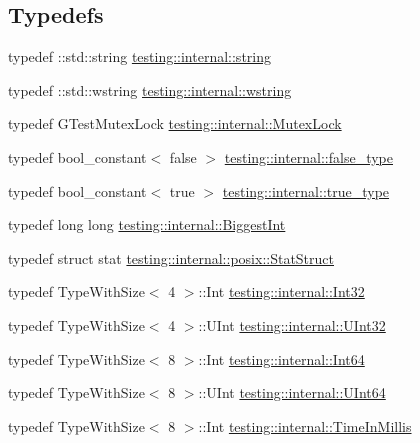 \subsection*{Typedefs}
\begin{DoxyCompactItemize}
\item 
typedef \+::std\+::string \hyperlink{namespacetesting_1_1internal_a8e8ff5b11e64078831112677156cb111}{testing\+::internal\+::string}
\item 
typedef \+::std\+::wstring \hyperlink{namespacetesting_1_1internal_a3f543179329c353aee1d7b54a9a8e335}{testing\+::internal\+::wstring}
\item 
typedef G\+Test\+Mutex\+Lock \hyperlink{namespacetesting_1_1internal_a08b187c6cc4e28400aadf9a32fccc8de}{testing\+::internal\+::\+Mutex\+Lock}
\item 
typedef bool\+\_\+constant$<$ false $>$ \hyperlink{namespacetesting_1_1internal_abb1d0789f19bdde21affccbd1078b525}{testing\+::internal\+::false\+\_\+type}
\item 
typedef bool\+\_\+constant$<$ true $>$ \hyperlink{namespacetesting_1_1internal_a62f917c3424d8841de9b49b5ec28edb4}{testing\+::internal\+::true\+\_\+type}
\item 
typedef long long \hyperlink{namespacetesting_1_1internal_a05c6bd9ede5ccdf25191a590d610dcc6}{testing\+::internal\+::\+Biggest\+Int}
\item 
typedef struct stat \hyperlink{namespacetesting_1_1internal_1_1posix_a8eb9f08d3af29941c2d2a964cfff3ecb}{testing\+::internal\+::posix\+::\+Stat\+Struct}
\item 
typedef Type\+With\+Size$<$ 4 $>$\+::Int \hyperlink{namespacetesting_1_1internal_a8ee38faaf875f133358abaf9bc056cec}{testing\+::internal\+::\+Int32}
\item 
typedef Type\+With\+Size$<$ 4 $>$\+::U\+Int \hyperlink{namespacetesting_1_1internal_a40d4fffcd2bf56f18b1c380615aa85e3}{testing\+::internal\+::\+U\+Int32}
\item 
typedef Type\+With\+Size$<$ 8 $>$\+::Int \hyperlink{namespacetesting_1_1internal_a271c563fec38b804ddab0677f51f70a8}{testing\+::internal\+::\+Int64}
\item 
typedef Type\+With\+Size$<$ 8 $>$\+::U\+Int \hyperlink{namespacetesting_1_1internal_aa6a1ac454e6d7e550fa4925c62c35caa}{testing\+::internal\+::\+U\+Int64}
\item 
typedef Type\+With\+Size$<$ 8 $>$\+::Int \hyperlink{namespacetesting_1_1internal_a66a845df404b38fe85c5e14a069f255a}{testing\+::internal\+::\+Time\+In\+Millis}
\end{DoxyCompactItemize}
